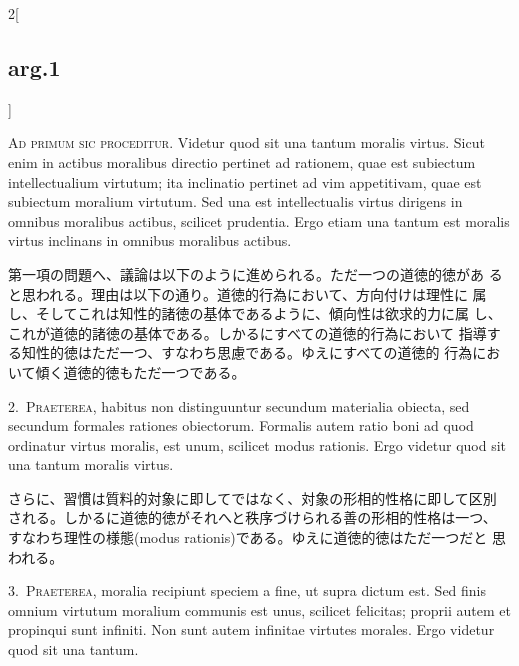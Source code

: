 \documentclass[paper=a4paper,fontsize=10pt,jafontsize=9pt,titlepage]{jlreq}
\begin{document}
\begin{paracol}{2}[\subsection{arg.1}]

{\scshape Ad primum sic proceditur}. Videtur quod sit una tantum
moralis virtus. Sicut enim in actibus moralibus directio pertinet ad
rationem, quae est subiectum intellectualium virtutum; ita inclinatio
pertinet ad vim appetitivam, quae est subiectum moralium virtutum. Sed
una est intellectualis virtus dirigens in omnibus moralibus actibus,
scilicet prudentia. Ergo etiam una tantum est moralis virtus inclinans
in omnibus moralibus actibus.

\switchcolumn

第一項の問題へ、議論は以下のように進められる。ただ一つの道徳的徳があ
 ると思われる。理由は以下の通り。道徳的行為において、方向付けは理性に
 属し、そしてこれは知性的諸徳の基体であるように、傾向性は欲求的力に属
 し、これが道徳的諸徳の基体である。しかるにすべての道徳的行為において
 指導する知性的徳はただ一つ、すなわち思慮である。ゆえにすべての道徳的
 行為において傾く道徳的徳もただ一つである。


2.~{\scshape Praeterea}, habitus non distinguuntur secundum materialia
obiecta, sed secundum formales rationes obiectorum. Formalis autem
ratio boni ad quod ordinatur virtus moralis, est unum, scilicet modus
rationis. Ergo videtur quod sit una tantum moralis virtus.

\switchcolumn

さらに、習慣は質料的対象に即してではなく、対象の形相的性格に即して区別
される。しかるに道徳的徳がそれへと秩序づけられる善の形相的性格は一つ、
すなわち理性の様態(modus rationis)である。ゆえに道徳的徳はただ一つだと
思われる。


3.~{\scshape Praeterea}, moralia recipiunt speciem a fine, ut supra
dictum est. Sed finis omnium virtutum moralium communis est unus,
scilicet felicitas; proprii autem et propinqui sunt infiniti. Non sunt
autem infinitae virtutes morales. Ergo videtur quod sit una tantum.


\end{paracol}
\end{document}
